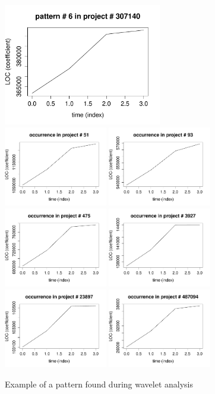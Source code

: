 \begin{figure}[H]
\caption{Example of a pattern found during wavelet
analysis}\label{figure:patterns_plots}
\centering
	\includegraphics[width=196pt]{images/pattern_6.pdf}\\
	\vspace{1em}
	\includegraphics[width=128pt]{images/pattern_6_seq_e.pdf}
	\includegraphics[width=128pt]{images/pattern_6_seq_d.pdf}
	\includegraphics[width=128pt]{images/pattern_6_seq_c.pdf}
	\includegraphics[width=128pt]{images/pattern_6_seq_f.pdf}
	\includegraphics[width=128pt]{images/pattern_6_seq_a.pdf}
	\includegraphics[width=128pt]{images/pattern_6_seq_b.pdf}
\end{figure}
